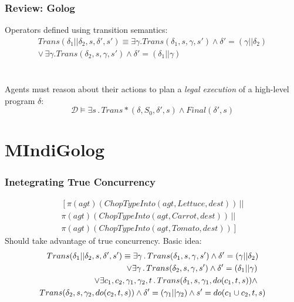 \documentclass[compress]{beamer}
\begin{document}
\begin{frame}
\frametitle{Review: Golog}
Operators defined using transition semantics:
\begin{multline*}
Trans(\delta_{1}||\delta_{2},s,\delta',s')\equiv\exists\gamma.Trans(\delta_{1},s,\gamma,s')\wedge\delta'=(\gamma||\delta_{2})\\
\vee\,\exists\gamma.Trans(\delta_{2},s,\gamma,s')\wedge\delta'=(\delta_{1}||\gamma)
\end{multline*}
\ \\
\ \\
Agents must reason about their actions to plan a \emph{legal execution} of
a high-level program $\delta$:
\begin{equation*}
\mathcal{D}\models\exists s\,.\,Trans*(\delta,S_0,\delta',s)\wedge Final(\delta',s)
\end{equation*}
\end{frame}

\section{MIndiGolog}

\begin{frame}
\frametitle{Inetegrating True Concurrency}
\begin{multline*}
\left[\pi(agt)(ChopTypeInto(agt,Lettuce,dest))\,||\right.\\
\pi(agt)(ChopTypeInto(agt,Carrot,dest))\,||\\
\left.\pi(agt)(ChopTypeInto(agt,Tomato,dest))\right]
\end{multline*}
\pause
Should take advantage of true concurrency.  Basic idea:
\begin{multline*}
Trans(\delta_{1}||\delta_{2},s,\delta',s')\equiv\exists\gamma\,.\, Trans(\delta_{1},s,\gamma,s')\wedge\delta'=(\gamma||\delta_{2})\\
\shoveright{\vee\exists\gamma\,.\, Trans(\delta_{2},s,\gamma,s')\wedge\delta'=(\delta_{1}||\gamma)}\\
\shoveright{\vee\exists c_{1},c_{2},\gamma_{1},\gamma_{2},t\,.\, Trans(\delta_{1},s,\gamma_{1},do(c_{1},t,s))\wedge}\\ 
Trans(\delta_{2},s,\gamma_{2},do(c_{2},t,s))\wedge\delta'=(\gamma_{1}||\gamma_{2})\wedge s'=do(c_{1}\cup c_{2},t,s)
\end{multline*}
\end{frame}
\end{document}
